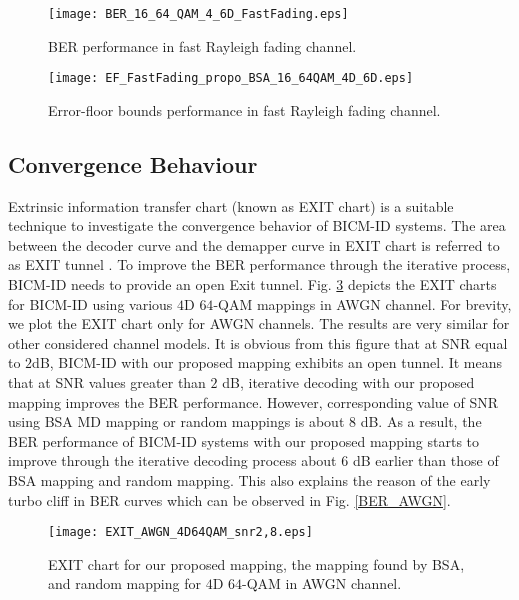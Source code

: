 \documentclass[12pt, draftclsnofoot, onecolumn]{IEEEtran}
\begin{document}
\begin{figure}[H]
\centering
\texttt{[image: BER\_16\_64\_QAM\_4\_6D\_FastFading.eps]}
\caption{BER performance in  fast Rayleigh fading channel.}
\label{BER_Fast_Rayleigh}
\end{figure}

\begin{figure}[H]
\centering
\texttt{[image: EF\_FastFading\_propo\_BSA\_16\_64QAM\_4D\_6D.eps]}
\caption{Error-floor bounds performance in fast Rayleigh fading channel.}
\label{EF_Fast_Rayleigh}
\end{figure}

\subsection{Convergence Behaviour} Extrinsic information transfer chart (known as EXIT chart) \cite{EXIT} is a suitable technique to investigate the convergence behavior of BICM-ID systems.  The area between the decoder curve and the demapper curve in EXIT chart is referred to as EXIT tunnel \cite{Rob_EXIT}. To improve the BER performance through the iterative process, BICM-ID needs to provide an open Exit tunnel. 
Fig. \ref{EXIT_AWGN} depicts the EXIT charts for BICM-ID using various $4$D $64$-QAM mappings in  AWGN channel.  For brevity, we plot the EXIT chart only for AWGN channels.  The results are very similar for other considered channel models.  %
It is obvious from this figure that at SNR equal to $2$dB, BICM-ID with our  proposed mapping exhibits  an open tunnel. It means that at SNR values greater than $2$ dB, iterative decoding with our proposed mapping   improves the BER performance. However, corresponding value of SNR using BSA MD mapping   or random mappings \color{black}  is about $8$ dB. As a result, the BER performance of BICM-ID systems with our proposed mapping starts to  improve through the iterative decoding process  about $6$ dB earlier  than   those of  BSA mapping  and random mapping. \color{black} %
 This also explains the reason of the  early turbo cliff in  BER curves  which can be observed in Fig. \ref{BER_AWGN}. 
 
\begin{figure}[H]
\centering
\texttt{[image: EXIT\_AWGN\_4D64QAM\_snr2,8.eps]}
\caption{ EXIT chart for our  proposed mapping, the mapping found by BSA,  and  random mapping  \color{black}for $4$D $64$-QAM in  AWGN channel.}
\label{EXIT_AWGN}
\end{figure}
\end{document}

